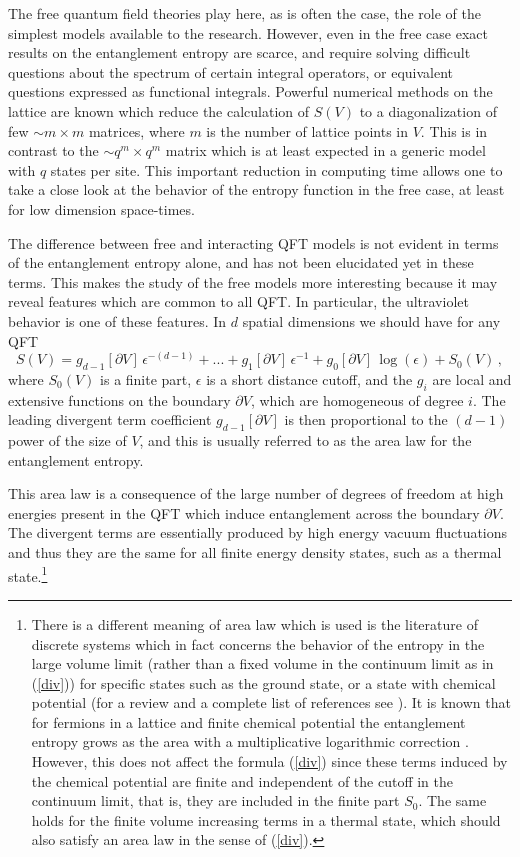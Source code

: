 \documentclass[11pt]{article}
\begin{document}
The free quantum field theories play here, as is often the case, the role of the simplest models available to the research. However, even in the free case exact results on the entanglement entropy are scarce, and require  solving difficult questions about the spectrum of certain integral operators, or equivalent questions expressed as functional integrals. Powerful numerical methods on the lattice are known which reduce the calculation of $S(V)$ to a diagonalization of few $\sim m\times m$ matrices, where $m$ is the number of lattice points in $V$. 
This is in contrast to the $\sim q^m\times q^m$ matrix which is at least expected in a generic model with $q$ states per site. This important reduction in computing time allows one to take a close look at the behavior of the entropy function in the free case, at least for low dimension space-times. 
 
The difference between free and interacting QFT models is not evident in terms of the entanglement entropy alone, and has not been elucidated yet in these terms. This makes the study of the free models more interesting because it may reveal features which are common to all QFT. In particular, the ultraviolet behavior is one of these features. In $d$ spatial dimensions we should have for any QFT 
 \begin{equation}
 S(V)=g_{d-1}[\partial V]\,\epsilon^{-(d-1)}+...+ g_1[\partial V]\,\epsilon^{-1} + g_0[\partial V]\,\log (\epsilon)+ S_0(V)\,,   \label{div}
 \end{equation}
where $S_0(V)$ is a finite part, $\epsilon$ is a short distance cutoff, and the $g_i$ are local and extensive  functions on the boundary $\partial V$, which are homogeneous of degree $i$. The leading divergent term coefficient  $g_{d-1}[\partial V]$ is then proportional to the $(d-1)$ power of the size of $V$, and this is usually referred to as the area law for the entanglement entropy. 

This area law is a consequence of the large number of degrees of freedom at high energies present in the QFT which induce entanglement across the boundary $\partial V$. The divergent terms are essentially produced by high energy vacuum fluctuations and thus they are the same for all finite energy density states, such as a thermal state.\footnote{There is a different meaning of area law which is used is the literature of discrete systems which in fact concerns the behavior of the entropy in the large volume limit (rather than a fixed volume in the continuum limit as in (\ref{div})) for specific states such as the ground state, or a state with chemical potential (for a review and a complete list of references see \cite{ecp}). It is known that for fermions in a lattice and finite chemical potential the entanglement entropy grows as the area with a multiplicative logarithmic correction \cite{fermionic1}. However, this does not affect the formula (\ref{div}) since these terms induced by the chemical potential are finite and independent of the cutoff in the continuum limit, that is, they are included in the finite part $S_0$. The same holds for the finite volume increasing terms in a thermal state, which should also satisfy an area law in the sense of (\ref{div}).} 
\end{document}

